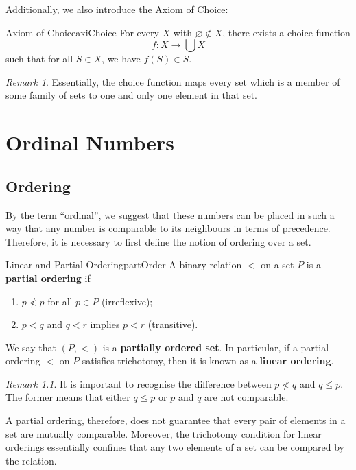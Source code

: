 \documentclass[math]{amznotes}
\theoremstyle{remark}
\newtheorem*{remark}{Remark}
\begin{document}
Additionally, we also introduce the Axiom of Choice:
\begin{axibox}{Axiom of Choice}{axiChoice}
    For every $X$ with $\varnothing \notin X$, there exists a choice function
    \begin{displaymath}
        f \colon X \to \bigcup X
    \end{displaymath}
    such that for all $S \in X$, we have $f(S) \in S$.
\end{axibox}
\begin{notebox}
    \begin{remark}
        Essentially, the choice function maps every set which is a member of some family of sets to one and only one element in that set.
    \end{remark}
\end{notebox}

\chapter{Ordinal Numbers}
\section{Ordering}
By the term ``ordinal'', we suggest that these numbers can be placed in such a way that any number is comparable to its neighbours in terms of precedence. Therefore, it is necessary to first define the notion of ordering over a set.
\begin{dfnbox}{Linear and Partial Ordering}{partOrder}
    A binary relation $<$ on a set $P$ is a {\color{red} \textbf{partial ordering}} if 
    \begin{enumerate}
        \item $p \not < p$ for all $p \in P$ (irreflexive);
        \item $p < q$ and $q < r$ implies $p < r$ (transitive).
    \end{enumerate}
    We say that $(P, <)$ is a {\color{red} \textbf{partially ordered set}}. In particular, if a partial ordering $<$ on $P$ satisfies trichotomy, then it is known as a {\color{red} \textbf{linear ordering}}.
\end{dfnbox}
\begin{notebox}
    \begin{remark}
        It is important to recognise the difference between $p \not < q$ and $q \leq p$. The former means that either $q \leq p$ or $p$ and $q$ are not comparable.
    \end{remark}
\end{notebox}
A partial ordering, therefore, does not guarantee that every pair of elements in a set are mutually comparable. Moreover, the trichotomy condition for linear orderings essentially confines that any two elements of a set can be compared by the relation.
\end{document}
